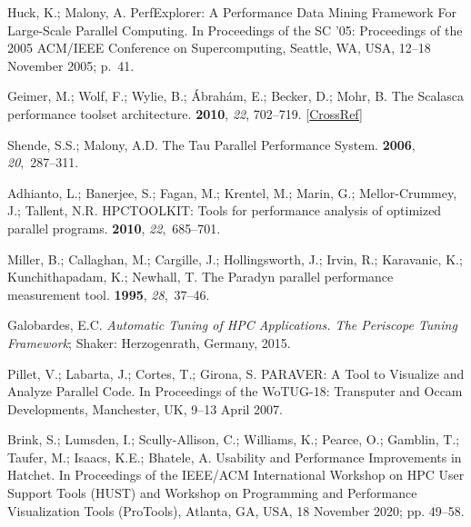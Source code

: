 \begin{thebibliography}{999}
	Huck, K.; Malony, A.
	\newblock PerfExplorer: A Performance Data Mining Framework For Large-Scale
	Parallel Computing.
	\newblock In Proceedings of the SC '05: Proceedings of the 2005 ACM/IEEE Conference on
	Supercomputing, Seattle, WA, USA, 12--18 November 2005; p.~41.
	
	
	Geimer, M.; Wolf, F.; Wylie, B.; {\'A}brah{\'a}m, E.; Becker, D.; Mohr, B.
	\newblock The Scalasca performance toolset architecture.
	 {\bf
		2010}, {\em 22}, 702--719. [\href{http://dx.doi.org/10.1002/cpe.1556}{CrossRef}]
	
	Shende, S.S.; Malony, A.D.
	\newblock The Tau Parallel Performance System.
	 {\bf 2006}, {\em 20},~287--311.
	
	
	Adhianto, L.; Banerjee, S.; Fagan, M.; Krentel, M.; Marin, G.; Mellor-Crummey,
	J.; Tallent, N.R.
	\newblock HPCTOOLKIT: Tools for performance analysis of optimized parallel
	programs.
	 {\bf 2010},
	{\em 22},~685--701.
	
	
	Miller, B.; Callaghan, M.; Cargille, J.; Hollingsworth, J.; Irvin, R.;
	Karavanic, K.; Kunchithapadam, K.; Newhall, T.
	\newblock The Paradyn parallel performance measurement tool.
	 {\bf 1995}, {\em 28},~37--46.
	
	
	Galobardes, E.C.
	\newblock \emph{Automatic Tuning of HPC Applications. The Periscope Tuning Framework};
	\newblock Shaker: Herzogenrath, Germany, 2015.
	
	Pillet, V.; Labarta, J.; Cortes, T.; Girona, S.
	\newblock PARAVER: A Tool to Visualize and Analyze Parallel Code. In Proceedings of the WoTUG-18: Transputer and Occam Developments, Manchester, UK, 9--13 April 2007.
	
	
	Brink, S.; Lumsden, I.; Scully-Allison, C.; Williams, K.; Pearce, O.; Gamblin,
	T.; Taufer, M.; Isaacs, K.E.; Bhatele, A.
	\newblock Usability and Performance Improvements in Hatchet.
	\newblock In Proceedings of the IEEE/ACM International Workshop on HPC User Support Tools
	(HUST) and Workshop on Programming and Performance Visualization Tools
	(ProTools), Atlanta, GA, USA, 18 November 2020; pp. 49--58.
	

\end{thebibliography}
